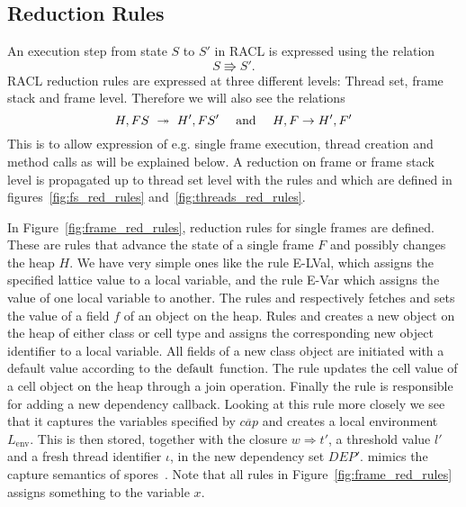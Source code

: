 
\subsection{Reduction Rules}%
\label{sub:reduction_rules}

An execution step from state $S$ to $S'$ in RACL is expressed using the relation
\begin{equation*}
  S \Rrightarrow S'.
\end{equation*}
RACL reduction rules are expressed at three different levels:
Thread set, frame stack and frame level. 
Therefore we will also see the relations 
\begin{equation*}
  H, FS \;\mbox{~$\twoheadrightarrow$~}\; H', FS' \quad \text{ and } \quad H, F\; \mbox{$\rightarrow$}\; H', F'
\end{equation*}
This is to allow expression of e.g. single frame execution,
thread creation and method calls as will be explained below. 
A reduction on frame or frame stack level is propagated up to thread set level
with the rules \EFProp{} and \EFSProp{} which are defined in
figures~\ref{fig:fs_red_rules} and~\ref{fig:threads_red_rules}.

In Figure~\ref{fig:frame_red_rules}, reduction rules for single frames are
defined. These are rules that advance the state of a single frame $F$ and
possibly changes the heap $H$. We have very simple ones like the rule {\sc
E-LVal}, which assigns the specified lattice value to a local variable, and the
rule {\sc E-Var} which assigns the value of one local variable to another.
The rules \ESelect{} and \EAssign{} respectively fetches and sets the value of a
field $f$ of an object on the heap. Rules \ENew{} and \ENewCell{} creates a new
object on the heap of either class or cell type and assigns the corresponding
new object identifier to a local variable. All fields of a new class object are
initiated with a default value according to the $\mbox{$\mathrm{default}$}$ function. The rule
\EPut{} updates the cell value of a cell object on the heap through a join
operation.  Finally the rule \EWhen{} is responsible for adding a new dependency
callback. Looking at this rule more closely we see that it captures the
variables specified by $\overline{cap}$ and creates a local environment
$L_{\text{env}}$. This is then stored, together with the closure $w \Rightarrow
t'$, a threshold value $l'$ and a fresh thread identifier $\iota$, in the new
dependency set $DEP'$. \EWhen{} mimics the capture semantics of
spores~\parencite{conf/ecoop/MillerHO14}.  Note that all rules in
Figure~\ref{fig:frame_red_rules} assigns something to the variable $x$.

